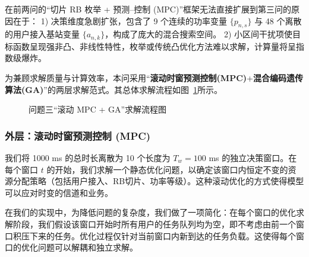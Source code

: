 在前两问的“切片 RB 枚举 + 预测–控制 (MPC)”框架无法直接扩展到第三问的原因在于：
1) 决策维度急剧扩张，包含了 9 个连续的功率变量 $\{p_{n,s}\}$ 与 48 个离散的用户接入基站变量 $\{a_{n,k}\}$，构成了庞大的混合搜索空间。
2) 小区间干扰项使目标函数呈现强非凸、非线性特性，枚举或传统凸优化方法难以求解，计算量将呈指数级爆炸。

为兼顾求解质量与计算效率，本问采用“\textbf{滚动时窗预测控制(MPC)}+\textbf{混合编码遗传算法(GA)}”的两层求解范式。其总体求解流程如图~\ref{fig:flow_q3}所示。

\begin{figure}[htbp]
  \centering
  \caption{问题三“滚动 MPC + GA”求解流程图}
  \label{fig:flow_q3}
\end{figure}

\subsubsection{外层：滚动时窗预测控制 (MPC)}
我们将 1000 ms 的总时长离散为 10 个长度为 $T_w=100$ ms 的独立决策窗口。在每个窗口 $t$ 的开始，我们求解一个静态优化问题，以确定该窗口内恒定不变的资源分配策略（包括用户接入、RB切片、功率等级）。这种滚动优化的方式使得模型可以应对时变的信道和业务。

在我们的实现中，为降低问题的复杂度，我们做了一项简化：在每个窗口的优化求解阶段，我们假设该窗口开始时所有用户的任务队列均为空，即不考虑由前一个窗口积压下来的任务。优化过程仅针对当前窗口内新到达的任务负载。这使得每个窗口的优化问题可以解耦和独立求解。

